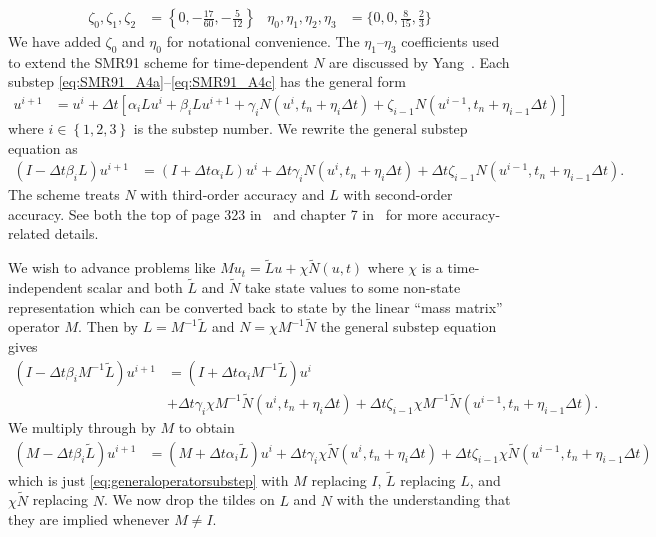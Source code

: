 \documentclass[letterpaper,11pt,nointlimits,reqno,draft]{amsart}
\begin{document}
\begin{align*}
  \zeta_0, \zeta_1, \zeta_2 &= \left\{
    0, -\frac{17}{60}, -\frac{5}{12}
  \right\}
  &
  \eta_0, \eta_1, \eta_2, \eta_3 &= \Biggl\{
    0, 0, \frac{8}{15}, \frac{2}{3}
  \Biggr\}
\end{align*}
We have added $\zeta_0$ and $\eta_0$ for notational convenience.  The
$\eta_{1}$--$\eta_{3}$ coefficients used to extend the SMR91 scheme for
time-dependent $N$ are discussed by Yang~\cite{ShanYang2011}.  Each substep
\eqref{eq:SMR91_A4a}--\eqref{eq:SMR91_A4c} has the general form
\begin{align}
  u^{i+1} &= u^i + \Delta{}t \left[
        \alpha_{i} L u^i
      + \beta_{i}  L u^{i+1}
      + \gamma_{i} N\left( u^{i}, t_{n}+\eta_{i}\Delta{}t \right)
      + \zeta_{i-1} N\left( u^{i-1}, t_{n}+\eta_{i-1}\Delta{}t \right)
  \right]
  \label{eq:generalsubstep}
\end{align}
where $i\in\left\{ 1,2,3 \right\}$ is the substep number.
We rewrite the general substep equation as
\begin{align}
  \left(I - \Delta{}t\beta_{i}L\right) u^{i+1}
  &=
  \left(I + \Delta{}t\alpha_{i}L\right) u^{i}
  + \Delta{}t\gamma_{i}N\left(u^{i}, t_{n}+\eta_{i}\Delta{}t\right)
  + \Delta{}t\zeta_{i-1}N\left(u^{i-1}, t_{n}+\eta_{i-1}\Delta{}t\right)
  \label{eq:generaloperatorsubstep}
  .
\end{align}
The scheme treats $N$ with third-order accuracy and $L$ with second-order
accuracy.  See both the top of page 323 in~\cite{spalart_lowstoragerk} and
chapter 7 in~\cite{ShanYang2011} for more accuracy-related details.

We wish to advance problems like $Mu_{t}=\tilde{L}u+\chi\tilde{N}\left( u,t
\right)$ where $\chi$ is a time-independent scalar and both $\tilde{L}$ and
$\tilde{N}$ take state values to some non-state representation which can be
converted back to state by the linear ``mass matrix'' operator $M$.  Then by
$L=M^{-1}\tilde{L}$ and $N=\chi{}M^{-1}\tilde{N}$ the general substep equation
gives
\begin{align}
  \left(I - \Delta{}t\beta_{i}M^{-1}\tilde{L}\right) u^{i+1}
  &=
  \left(I + \Delta{}t\alpha_{i}M^{-1}\tilde{L}\right) u^{i}
\\
  &+ \Delta{}t\gamma_{i}\chi{}M^{-1}
    \tilde{N}\left(u^{i}, t_{n}+\eta_{i}\Delta{}t\right)
  + \Delta{}t\zeta_{i-1}\chi{}M^{-1}
    \tilde{N}\left(u^{i-1}, t_{n}+\eta_{i-1}\Delta{}t\right)
  .
\end{align}
We multiply through by $M$ to obtain
\begin{align}
  \left(M - \Delta{}t\beta_{i}\tilde{L}\right) u^{i+1}
  &=
  \left(M + \Delta{}t\alpha_{i}\tilde{L}\right) u^{i}
  + \Delta{}t\gamma_{i}\chi{}
    \tilde{N}\left(u^{i}, t_{n}+\eta_{i}\Delta{}t\right)
  + \Delta{}t\zeta_{i-1}\chi{}
    \tilde{N}\left(u^{i-1}, t_{n}+\eta_{i-1}\Delta{}t\right)
  \label{eq:generaloperatormasssubstep}
\end{align}
which is just \eqref{eq:generaloperatorsubstep} with $M$ replacing $I$,
$\tilde{L}$ replacing $L$, and $\chi{}\tilde{N}$ replacing $N$.  We now drop
the tildes on $L$ and $N$ with the understanding that they are implied whenever
$M\neq{}I$.
\end{document}

